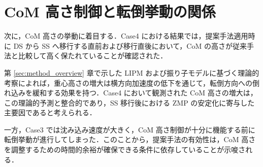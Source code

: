 \section{CoM 高さ制御と転倒挙動の関係}
\label{sec:discussion_com_height}

次に，CoM 高さの挙動に着目する．Case4 における結果では，提案手法適用時に DS から SS へ移行する直前および移行直後において，CoM の高さが従来手法と比較して高く保たれていることが確認された．

第 \ref{sec:method_overview} 章で示した LIPM および振り子モデルに基づく理論的考察によれば，重心高さの増大は横方向加速度の低下を通じて，転倒方向への倒れ込みを緩和する効果を持つ．Case4 において観測された CoM 高さの増大は，この理論的予測と整合的であり，SS 移行後における ZMP の安定化に寄与した主要因であると考えられる．

一方，Case3 では沈み込み速度が大きく，CoM 高さ制御が十分に機能する前に転倒挙動が進行してしまった．このことから，提案手法の有効性は，CoM 高さを調整するための時間的余裕が確保できる条件に依存していることが示唆される．
